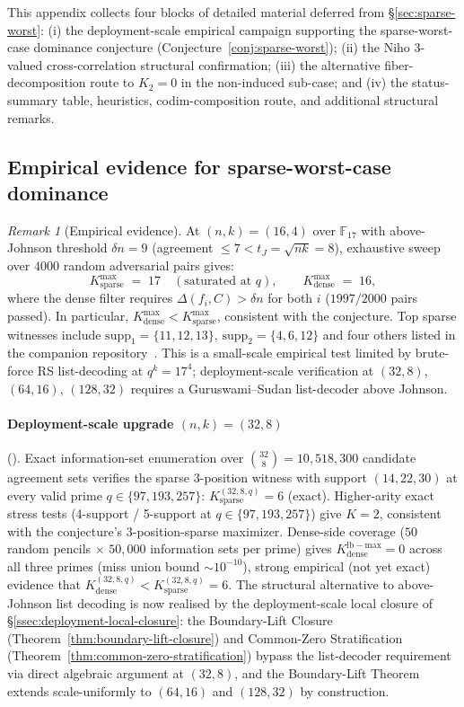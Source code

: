 \documentclass[11pt]{article}
\theoremstyle{definition}
\theoremstyle{remark}
\newtheorem{remark}[theorem]{Remark}
\newcommand{\FF}{\mathbb{F}}
\begin{document}
This appendix collects four blocks of detailed material deferred from
\S\ref{sec:sparse-worst}: (i) the deployment-scale empirical
campaign supporting the sparse-worst-case dominance conjecture
(Conjecture~\ref{conj:sparse-worst}); (ii) the Niho 3-valued
cross-correlation structural confirmation; (iii) the alternative
fiber-decomposition route to $K_2 = 0$ in the non-induced sub-case;
and (iv) the status-summary table, heuristics, codim-composition
route, and additional structural remarks.

\subsection{Empirical evidence for sparse-worst-case dominance}
\label{app:layer3-empirical}

\begin{remark}[Empirical evidence]
\label{rem:sparse-worst-empirical}
At $(n, k) = (16, 4)$ over $\FF_{17}$ with above-Johnson threshold
$\delta n = 9$ (agreement $\leq 7 < t_J = \sqrt{nk} = 8$), exhaustive
sweep over $4000$ random adversarial pairs gives:
\[
 K_{\mathrm{sparse}}^{\max} \;=\; 17 \quad (\text{saturated at } q),
 \qquad
 K_{\mathrm{dense}}^{\max} \;=\; 16,
\]
where the dense filter requires $\Delta(f_i, C) > \delta n$ for both
$i$ ($1997 / 2000$ pairs passed). In particular,
$K_{\mathrm{dense}}^{\max} < K_{\mathrm{sparse}}^{\max}$, consistent
with the conjecture. Top sparse witnesses include $\mathrm{supp}_1
= \{11, 12, 13\}$, $\mathrm{supp}_2 = \{4, 6, 12\}$ and four others
listed in the companion repository~\cite{CompanionRepo}. This is a small-scale empirical test
limited by brute-force RS list-decoding at $q^k = 17^4$;
deployment-scale verification at $(32, 8)$, $(64, 16)$, $(128, 32)$
requires a Guruswami--Sudan list-decoder above Johnson.

\paragraph{Deployment-scale upgrade $(n, k) = (32, 8)$}
(\cite{CompanionRepo}). Exact information-set enumeration over
$\binom{32}{8} = 10{,}518{,}300$ candidate agreement sets verifies
the sparse 3-position witness with support $(14, 22, 30)$ at every
valid prime $q \in \{97, 193, 257\}$:
$K_{\mathrm{sparse}}^{(32,8,q)} = 6$ (exact). Higher-arity exact
stress tests (4-support / 5-support at $q \in \{97, 193, 257\}$)
give $K = 2$, consistent with the conjecture's 3-position-sparse
maximizer. Dense-side coverage ($50$ random pencils $\times$
$50{,}000$ information sets per prime) gives
$K_{\mathrm{dense}}^{\mathrm{lb-max}} = 0$ across all three primes
(miss union bound ${\sim}10^{-10}$), strong empirical (not yet
exact) evidence that $K_{\mathrm{dense}}^{(32,8,q)} <
K_{\mathrm{sparse}}^{(32,8,q)} = 6$. The structural alternative to
above-Johnson list decoding is now realised by the deployment-scale
local closure of \S\ref{ssec:deployment-local-closure}: the Boundary-Lift
Closure (Theorem~\ref{thm:boundary-lift-closure}) and Common-Zero
Stratification (Theorem~\ref{thm:common-zero-stratification}) bypass the
list-decoder requirement via direct algebraic argument at $(32, 8)$, and
the Boundary-Lift Theorem extends scale-uniformly to $(64, 16)$ and
$(128, 32)$ by construction.


\end{remark}
\end{document}
